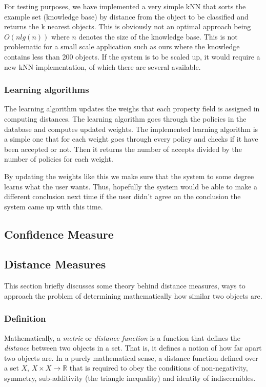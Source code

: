 For testing purposes, we have implemented a very simple kNN that sorts the example set (knowledge base) by distance from the object to be classified and returns the k nearest objects. This is obviously not an optimal approach being $O(n lg(n))$ where $n$ denotes the size of the knowledge base. This is not problematic for a small scale application such as ours where the knowledge contains less than 200 objects. If the system is to be scaled up, it would require a new kNN implementation, of which there are several available.


\subsubsection{Learning algorithms}\label{learnAlgos}
The learning algorithm updates the weighs that each property field is assigned in computing distances. The learning algorithm goes through the policies in the database and computes updated weights. The implemented learning algorithm is a simple one that for each weight goes through every policy and checks if it have been accepted or not. Then it returns the number of accepts divided by the number of policies for each weight.

By updating the weights like this we make sure that the system to some degree learns what the user wants. Thus, hopefully the system would be able to make a different conclusion next time if the user didn't agree on the conclusion the system came up with this time.

\subsection{Confidence Measure}\label{confidenceMeasure}%

\subsection{Distance Measures}\label{SimilarityMeasures}%

This section briefly discusses some theory behind distance measures, ways to approach the problem of determining mathematically how similar two objects are.

\subsubsection{Definition}

Mathematically, a \emph{metric} or \emph{distance function} is a function that defines the \emph{distance} between two objects in a set. That is, it defines a notion of how far apart two objects are. In a purely mathematical sense, a distance function defined over a set $X$, $X\times X\longrightarrow \mathbb{R}$ that is required to obey the conditions of non-negativity, symmetry, sub-additivity (the triangle inequality) and identity of indiscernibles. 

